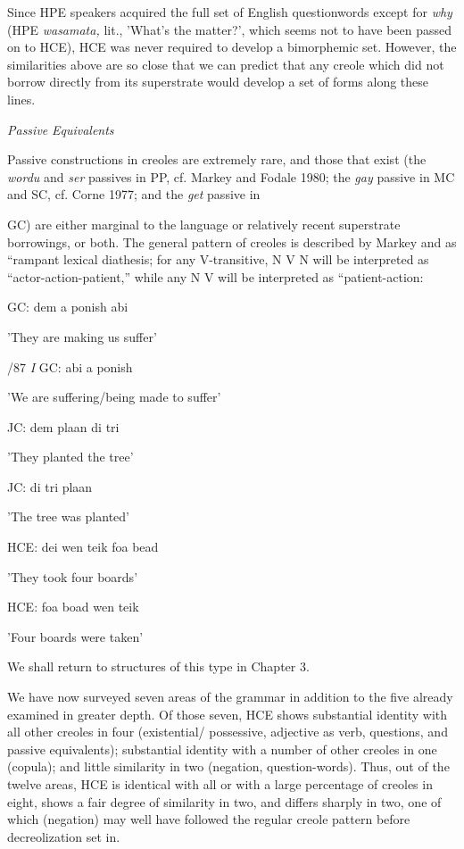 Since HPE speakers acquired the full set of English question\-words except for \textit{why} (HPE \textit{wasamata,} lit., 'What's the matter?', which seems not to have been passed on to HCE), HCE was never required to develop a bimorphemic set. However, the similarities above are so close that we can predict that any creole which did not borrow directly from its superstrate would develop a set of forms along these lines.

\textit{Passive} \textit{Equivalents}

Passive constructions in creoles are extremely rare, and those that exist (the \textit{wordu} and \textit{ser} passives in PP, cf. Markey and Fodale 1980; the \textit{gay} passive in MC and SC, cf. Corne 1977; and the \textit{get} passive in


GC) are either marginal to the language or relatively recent super\-strate borrowings, or both. The general pattern of creoles is described by Markey and \citet{Fodale1980} as ``rampant lexical diathesis{\textquotedbl}; for any V-transitive, N V N will be interpreted as ``actor-action-patient,'' while any N V will be interpreted as ``patient-action{\textquotedbl}:

\ea\label{ex:86}
 GC: dem a ponish abi
\glt
\z

'They are making us suffer'

/87 \textit{I }GC: abi a ponish

'We are suffering/being made to suffer'

\ea\label{ex:88}
 JC: dem plaan di tri
\glt
\z

'They planted the tree'

\ea\label{ex:89}
 JC: di tri plaan
\glt
\z

'The tree was planted'

\ea\label{ex:90}
 HCE: dei wen teik foa bead
\glt
\z

'They took four boards'

\ea\label{ex:91}
 HCE: foa boad wen teik
\glt
\z

'Four boards were taken'

We shall return to structures of this type in Chapter 3.

We have now surveyed seven areas of the grammar in addition to the five already examined in greater depth. Of those seven, HCE shows substantial identity with all other creoles in four (existential/ possessive, adjective as verb, questions, and passive equivalents); substantial iden\-tity with a number of other creoles in one (copula); and little simi\-larity in two (negation, question-words). Thus, out of the twelve areas, HCE is identical with all or with a large percentage of creoles in eight, shows a fair degree of similarity in two, and differs sharply in two, one of which (negation) may well have followed the regular creole pattern before decreolization set in.

